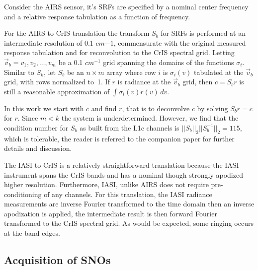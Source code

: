 \documentclass[twocolumn,10pt]{article}
\newcommand {\srf}  {\mbox{\small SRF}}
\begin{document}

Consider the AIRS sensor, it's SRFs are specified by a nominal center frequency and a relative response tabulation as a function of frequency.

For the AIRS to CrIS translation the transform $S_b$ for {\srf}s is performed at an intermediate
resolution of 0.1 $cm{-1}$, commensurate with the original measured response tabulation and for reconvolution to the CrIS spectral grid.  Letting $\vec v_b = v_1,v_2,\ldots,v_m$ be a
0.1 $cm^{-1}$ grid spanning the domains of the functions $\sigma_i$.
Similar to $S_k$, let $S_b$ be an $n\times m$ array where row $i$ is
$\sigma_i(v)$ tabulated at the $\vec v_b$ grid, with rows normalized
to~1.  If $r$ is radiance at the $\vec v_b$ grid, then $c = S_b r$
is still a reasonable approximation of $\int\sigma_i(v)r(v)\,dv$.

In this work we start with $c$ and find $r$, that is
to deconvolve $c$ by solving $S_b r = c$ for $r$.  Since $m < k$ the
system is underdetermined. However, we find that the condition number for $S_b$
as built from the L1c channels is $||S_b||_2||S_b^{-1}||_2 = 115$,
which is tolerable, the reader is referred to the companion paper \cite{Motteler2017a} for further details and discussion.

The IASI to CrIS is a relatively straightforward translation because the IASI instrument spans the CrIS bands and has a nominal though strongly apodized higher resolution. Furthermore, IASI, unlike AIRS does not require pre-conditioning of any channels. For this translation, the IASI radiance measurements are inverse Fourier transformed to the time domain then an inverse apodization is applied, the intermediate result is then forward Fourier transformed to the CrIS spectral grid. As would be expected, some ringing occurs at the band edges.

\subsection{Acquisition of SNOs}
\label{sec:orgheadline5}
\end{document}
